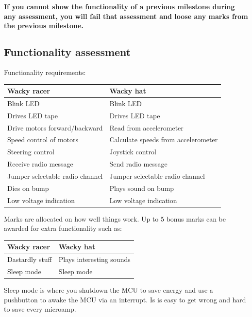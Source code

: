 \documentclass[11pt, a4paper]{article}
\begin{document}
\textbf{If you cannot show the functionality of a previous milestone
  during any assessment, you will fail that assessment and loose any
  marks from the previous milestone.}


\subsection{Functionality assessment}

Functionality requirements:
%
\begin{flushleft}
  \begin{tabular}{l|l}
    Wacky racer & Wacky hat \\ \hline \hline
    Blink LED                      & Blink LED \\
    Drives LED tape                & Drives LED tape \\
    Drive motors forward/backward  & Read from accelerometer \\
    Speed control of motors        & Calculate speeds from accelerometer \\
    Steering control               & Joystick control \\
    Receive radio message          & Send radio message \\
    Jumper selectable radio channel & Jumper selectable radio channel  \\
    Dies on bump                   & Plays sound on bump \\
    Low voltage indication         & Low voltage indication \\
  \end{tabular}
\end{flushleft}
%
Marks are allocated on how well things work.  Up to 5 bonus marks can
be awarded for extra functionality such as:
%
\begin{flushleft}
  \begin{tabular}{l|l}
    Wacky racer                & Wacky hat \\ \hline \hline
    Dastardly stuff            & Plays interesting sounds \\
    Sleep mode                 & Sleep mode \\
  \end{tabular}
\end{flushleft}

Sleep mode is where you shutdown the MCU to save energy and use a
pushbutton to awake the MCU via an interrupt.  Is is easy to get wrong
and hard to save every microamp.
\end{document}
